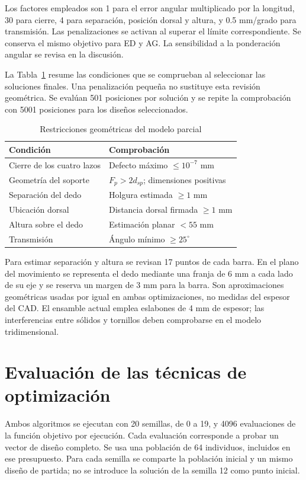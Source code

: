 \documentclass[conference,letterpaper]{IEEEtran}
\begin{document}
Los factores empleados son 1 para el error angular multiplicado por la longitud, 30 para cierre, 4 para separación, posición dorsal y altura, y 0.5 mm/grado para transmisión. Las penalizaciones se activan al superar el límite correspondiente. Se conserva el mismo objetivo para ED y AG. La sensibilidad a la ponderación angular se revisa en la discusión.

La Tabla~\ref{tab:restricciones} resume las condiciones que se comprueban al seleccionar las soluciones finales. Una penalización pequeña no sustituye esta revisión geométrica. Se evalúan 501 posiciones por solución y se repite la comprobación con 5001 posiciones para los diseños seleccionados.

\begin{table}[t]
\caption{Restricciones geométricas del modelo parcial}
\label{tab:restricciones}\centering\footnotesize
\begin{tabular}{p{}p{}}\toprule
Condición & Comprobación\\\midrule
Cierre de los cuatro lazos & Defecto máximo $\leq10^{-7}$ mm\\
Geometría del soporte & $F_p>2d_{sp}$; dimensiones positivas\\
Separación del dedo & Holgura estimada $\geq1$ mm\\
Ubicación dorsal & Distancia dorsal firmada $\geq1$ mm\\
Altura sobre el dedo & Estimación planar $<55$ mm\\
Transmisión & Ángulo mínimo $\geq25^\circ$\\\bottomrule
\end{tabular}
\end{table}

Para estimar separación y altura se revisan 17 puntos de cada barra. En el plano del movimiento se representa el dedo mediante una franja de 6 mm a cada lado de su eje y se reserva un margen de 3 mm para la barra. Son aproximaciones geométricas usadas por igual en ambas optimizaciones, no medidas del espesor del CAD. El ensamble actual emplea eslabones de 4 mm de espesor; las interferencias entre sólidos y tornillos deben comprobarse en el modelo tridimensional.

\section{Evaluación de las técnicas de optimización}
Ambos algoritmos se ejecutan con 20 semillas, de 0 a 19, y 4096 evaluaciones de la función objetivo por ejecución. Cada evaluación corresponde a probar un vector de diseño completo. Se usa una población de 64 individuos, incluidos en ese presupuesto. Para cada semilla se comparte la población inicial y un mismo diseño de partida; no se introduce la solución de la semilla 12 como punto inicial.
\end{document}
